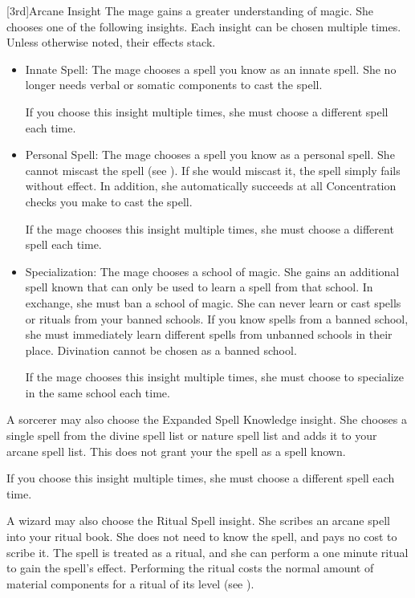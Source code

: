         [3rd]{Arcane Insight}\label{Arcane Insight}
        The mage gains a greater understanding of magic.
        She chooses one of the following insights.
        Each insight can be chosen multiple times.
        Unless otherwise noted, their effects stack.
        \begin{itemize}
            \item Innate Spell: The mage chooses a spell you know as an innate spell.
                She no longer needs verbal or somatic components to cast the spell.
                \par If you choose this insight multiple times, she must choose a different spell each time.
            \item Personal Spell: The mage chooses a spell you know as a personal spell.
                She cannot miscast the spell (see ).
                If she would miscast it, the spell simply fails without effect.
                In addition, she automatically succeeds at all Concentration checks you make to cast the spell.
                \par If the mage chooses this insight multiple times, she must choose a different spell each time.
            \item Specialization: The mage chooses a school of magic.
                She gains an additional spell known that can only be used to learn a spell from that school.
                In exchange, she must ban a school of magic.
                She can never learn or cast spells or rituals from your banned schools.
                If you know spells from a banned school, she must immediately learn different spells from unbanned schools in their place.
                Divination cannot be chosen as a banned school.
                \par If the mage chooses this insight multiple times, she must choose to specialize in the same school each time.
        \end{itemize}

         A sorcerer may also choose the Expanded Spell Knowledge insight.
        She chooses a single spell from the divine spell list or nature spell list and adds it to your arcane spell list.
        This does not grant your the spell as a spell known.
        \par If you choose this insight multiple times, she must choose a different spell each time.

         A wizard may also choose the Ritual Spell insight.
        She scribes an arcane spell into your ritual book.
        She does not need to know the spell, and pays no cost to scribe it.
        The spell is treated as a ritual, and she can perform a one minute ritual to gain the spell's effect.
        Performing the ritual costs the normal amount of material components for a ritual of its level (see ).

